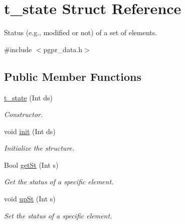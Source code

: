 \hypertarget{structt__state}{\section{t\+\_\+state Struct Reference}
\label{structt__state}
}


Status (e.\+g., modified or not) of a set of elements.  




{\ttfamily \#include $<$pgpr\+\_\+data.\+h$>$}

\subsection*{Public Member Functions}
\begin{DoxyCompactItemize}
\item 
\hyperlink{structt__state_a42c55e66207116e6e78283fd50414a1c}{t\+\_\+state} (Int ds)
\begin{DoxyCompactList}\small\item\em Constructor. \end{DoxyCompactList}\item 
void \hyperlink{structt__state_ac2e30425ac01de134c164fb1f2d11603}{init} (Int ds)
\begin{DoxyCompactList}\small\item\em Initialize the structure. \end{DoxyCompactList}\item 
Bool \hyperlink{structt__state_ac9637b03144741bb23da24c8ec61359b}{get\+St} (Int s)
\begin{DoxyCompactList}\small\item\em Get the status of a specific element. \end{DoxyCompactList}\item 
void \hyperlink{structt__state_ad627540f74cd0836ea8b32ec9dd1c299}{up\+St} (Int s)
\begin{DoxyCompactList}\small\item\em Set the status of a specific element. \end{DoxyCompactList}\end{DoxyCompactItemize}
